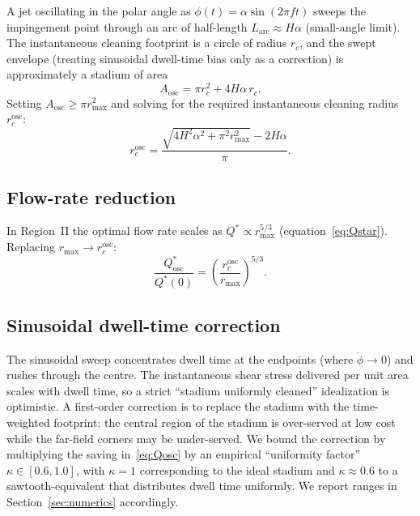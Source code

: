 \documentclass[aps,prfluids,reprint,amsmath,amssymb,floatfix]{revtex4-2}
\begin{document}
A jet oscillating in the polar angle as $\phi(t) = \alpha\sin(2\pi f t)$
sweeps the impingement point through an arc of half-length $L_\mathrm{arc}
\approx H\alpha$ (small-angle limit). The instantaneous cleaning footprint
is a circle of radius $r_c$, and the swept envelope (treating sinusoidal
dwell-time bias only as a correction) is approximately a stadium of area
\begin{equation}
  A_\mathrm{osc} = \pi r_c^2 + 4 H \alpha\,r_c.
  \label{eq:Aosc}
\end{equation}
Setting $A_\mathrm{osc} \geq \pi r_\mathrm{max}^2$ and solving for the
required instantaneous cleaning radius $r_c^\mathrm{osc}$:
\begin{equation}
  r_c^\mathrm{osc} =
  \frac{\sqrt{4 H^2 \alpha^2 + \pi^2 r_\mathrm{max}^2} - 2 H\alpha}{\pi}.
  \label{eq:rcosc}
\end{equation}

\subsection{Flow-rate reduction}

In Region~II the optimal flow rate scales as $Q^* \propto r_\mathrm{max}^{5/3}$
(equation~\eqref{eq:Qstar}). Replacing $r_\mathrm{max} \to r_c^\mathrm{osc}$:
\begin{equation}
  \frac{Q^*_\mathrm{osc}}{Q^*(0)} = \left(\frac{r_c^\mathrm{osc}}{r_\mathrm{max}}\right)^{5/3}.
  \label{eq:Qosc}
\end{equation}

\subsection{Sinusoidal dwell-time correction}

The sinusoidal sweep concentrates dwell time at the endpoints (where
$\dot\phi \to 0$) and rushes through the centre. The instantaneous
shear stress delivered per unit area scales with dwell time, so a strict
``stadium uniformly cleaned'' idealization is optimistic. A first-order
correction is to replace the stadium with the time-weighted footprint:
the central region of the stadium is over-served at low cost while the
far-field corners may be under-served. We bound the correction by
multiplying the saving in~\eqref{eq:Qosc} by an empirical
``uniformity factor'' $\kappa \in [0.6, 1.0]$, with $\kappa = 1$
corresponding to the ideal stadium and $\kappa \approx 0.6$ to a
sawtooth-equivalent that distributes dwell time uniformly. We report
ranges in Section~\ref{sec:numerics} accordingly.
\end{document}
